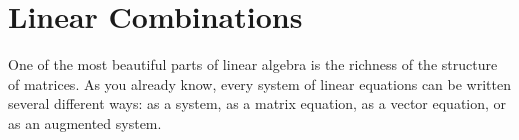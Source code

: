 %             
% 
%             
% 
% 
% 
% 

\section{Linear Combinations}
One of the most beautiful parts of linear algebra is the richness of the structure of
matrices. As you already know, every system of linear equations can be written several
different ways: as a system, as a matrix equation, as a vector equation, or as an
augmented system. 

